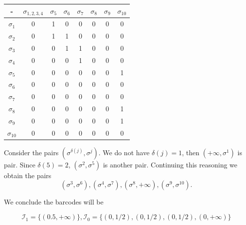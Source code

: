 \begin{center}
    \begin{tabular}{|c|c|c|c|c|c|c|c|}
        \hline
        -             & $\sigma_{1,2,3,4}$ & $\sigma_5$ & $\sigma_6$ & $\sigma_7$ & $\sigma_8$ & $\sigma_9$ & $\sigma_{10}$ \\ \hline
        $\sigma_1$    & 0                  & 1          & 0          & 0          & 0          & 0          & 0             \\ \hline
        $\sigma_2$    & 0                  & 1          & 1          & 0          & 0          & 0          & 0             \\ \hline
        $\sigma_3$    & 0                  & 0          & 1          & 1          & 0          & 0          & 0             \\ \hline
        $\sigma_4$    & 0                  & 0          & 0          & 1          & 0          & 0          & 0             \\ \hline
        $\sigma_5$    & 0                  & 0          & 0          & 0          & 0          & 0          & 1             \\ \hline
        $\sigma_6$    & 0                  & 0          & 0          & 0          & 0          & 0          & 0             \\ \hline
        $\sigma_7$    & 0                  & 0          & 0          & 0          & 0          & 0          & 0             \\ \hline
        $\sigma_8$    & 0                  & 0          & 0          & 0          & 0          & 0          & 1             \\ \hline
        $\sigma_9$    & 0                  & 0          & 0          & 0          & 0          & 0          & 1             \\ \hline
        $\sigma_{10}$ & 0                  & 0          & 0          & 0          & 0          & 0          & 0             \\ \hline
        \end{tabular}
\end{center}

Consider the pairs $(\sigma^{\delta(j)}, \sigma^j)$. We do not have $\delta(j)
= 1$, then $(+\infty, \sigma^1)$ is pair. Since $\delta(5) = 2$, $(\sigma^2,
\sigma^5)$ is another pair. Continuing this reasoning we obtain the pairs 
$$(\sigma^3, \sigma^6), (\sigma^4, \sigma^7), (\sigma^8, + \infty), (\sigma^9,
\sigma^{10}).$$  

We conclude the barcodes will be 

$$\mathcal{I}_1 = \{(0.5, + \infty)\}, \mathcal{I}_0 = \{(0, 1/2), (0, 1/2), (0, 1/2), (0, + \infty)\}$$